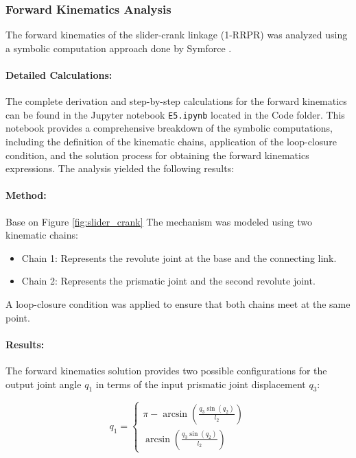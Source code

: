 \begin{solution}
    \subsubsection*{Forward Kinematics Analysis}

The forward kinematics of the slider-crank linkage (1-RRPR) was analyzed using a symbolic computation approach done by Symforce \cite{martiros2022symforce}.\paragraph{Detailed Calculations:} The complete derivation and step-by-step calculations for the forward kinematics can be found in the Jupyter notebook \texttt{E5.ipynb} located in the Code folder. This notebook provides a comprehensive breakdown of the symbolic computations, including the definition of the kinematic chains, application of the loop-closure condition, and the solution process for obtaining the forward kinematics expressions. The analysis yielded the following results:

\paragraph{Method:} Base on Figure \ref{fig:slider_crank} The mechanism was modeled using two kinematic chains:
\begin{itemize}
    \item Chain 1: Represents the revolute joint at the base and the connecting link.
    \item Chain 2: Represents the prismatic joint and the second revolute joint.
\end{itemize}

A loop-closure condition was applied to ensure that both chains meet at the same point.

\paragraph{Results:} The forward kinematics solution provides two possible configurations for the output joint angle $q_1$ in terms of the input prismatic joint displacement $q_3$:

\begin{equation}
q_1 = \begin{cases}
    \pi - \arcsin\left(\frac{q_3 \sin(q_2)}{l_2}\right) \\[10pt]
    \arcsin\left(\frac{q_3 \sin(q_2)}{l_2}\right)
\end{cases}
\end{equation}


\end{solution}
